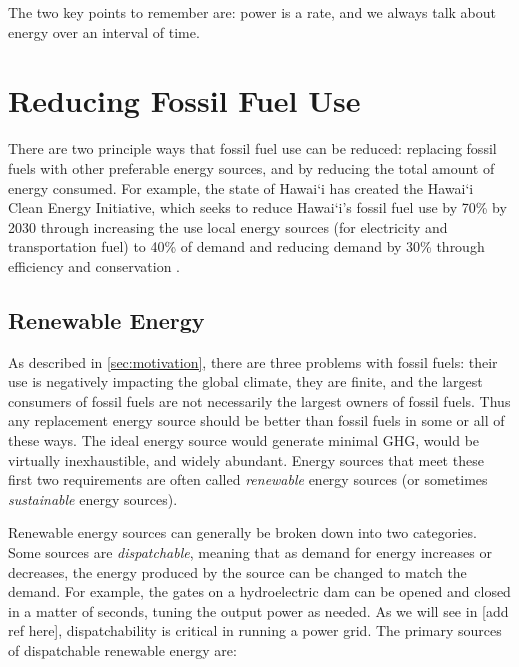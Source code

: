 The two key points to remember are: power is a rate, and we always talk about energy over an interval of time.

\section{Reducing Fossil Fuel Use}

There are two principle ways that fossil fuel use can be reduced: replacing fossil fuels with other preferable energy sources, and by reducing the total amount of energy consumed. For example, the state of Hawai`i has created the Hawai`i Clean Energy Initiative, which seeks to reduce Hawai`i's fossil fuel use by 70\% by 2030 through increasing the use local energy sources (for electricity and transportation fuel) to 40\% of demand and reducing demand by 30\% through efficiency and conservation \cite{HCEI-website}.

\subsection{Renewable Energy}

As described in \autoref{sec:motivation}, there are three problems with fossil fuels: their use is negatively impacting the global climate, they are finite, and the largest consumers of fossil fuels are not necessarily the largest owners of fossil fuels. Thus any replacement energy source should be better than fossil fuels in some or all of these ways. The ideal energy source would generate minimal GHG, would be virtually inexhaustible, and widely abundant. Energy sources that meet these first two requirements are often called \emph{renewable} energy sources (or sometimes \emph{sustainable} energy sources).

Renewable energy sources can generally be broken down into two categories. Some sources are \emph{dispatchable}, meaning that as demand for energy increases or decreases, the energy produced by the source can be changed to match the demand. For example, the gates on a hydroelectric dam can be opened and closed in a matter of seconds, tuning the output power as needed. As we will see in [add ref here], dispatchability is critical in running a power grid. The primary sources of dispatchable renewable energy are:


